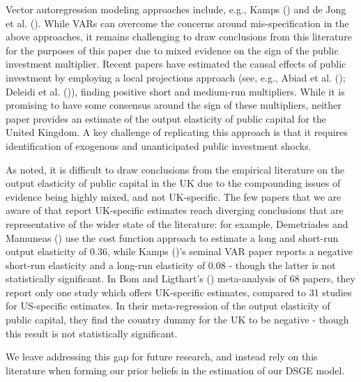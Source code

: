 \documentclass[titlepage, 11pt, a4paper]{article}
\renewcommand{\&}{and}
\begin{document}
Vector autoregression modeling approaches include, e.g., Kamps (\citeyear{kamps2005dynamic}) and de Jong et al. (\citeyear{de2017effect}). While VARs can overcome the concerns around mis-specification in the above approaches, it remains challenging to draw conclusions from this literature for the purposes of this paper due to mixed evidence on the sign of the public investment multiplier.
Recent papers have estimated the causal effects of public investment by employing a local projections approach (see, e.g., Abiad et al. (\citeyear{adb2016macroeconomic}); Deleidi et al. (\citeyear{deleidi2020public})), finding positive short and medium-run multipliers.
While it is promising to have some consensus around the sign of these multipliers, neither paper provides an estimate of the output elasticity of public capital for the United Kingdom. 
A key challenge of replicating this approach is that it requires identification of exogenous and unanticipated public investment shocks.

As noted, it is difficult to draw conclusions from the empirical literature on the output elasticity of public capital in the UK due to the compounding issues of evidence being highly mixed, and not UK-specific. The few papers that we are aware of that report UK-specific estimates reach diverging conclusions that are representative of the wider state of the literature: for example, Demetriades and Mamuneas (\citeyear{demetriades2000intertemporal}) use the cost function approach to estimate a long and short-run output elasticity of 0.36, while Kamps (\citeyear{kamps2005dynamic})'s seminal VAR paper reports a negative short-run elasticity and a long-run elasticity of 0.08 - though the latter is not statistically significant. In Bom and Ligthart's (\citeyear{bom2014have}) meta-analysis of 68 papers, they report only one study which offers UK-specific estimates, compared to 31 studies for US-specific estimates. In their meta-regression of the output elasticity of public capital, they find the country dummy for the UK to be negative - though this result is not statistically significant.

 

We leave addressing this gap for future research, and instead rely on this literature when forming our prior beliefs in the estimation of our DSGE model.
\end{document}
